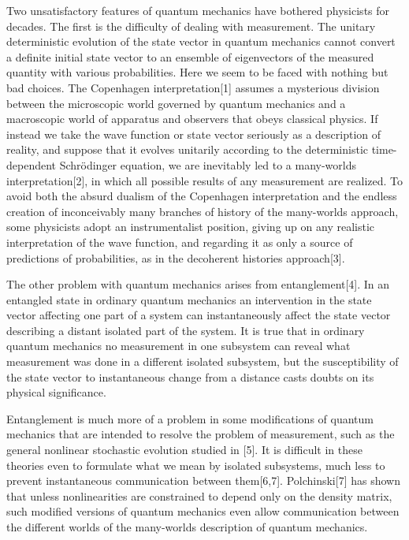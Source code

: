 Two unsatisfactory features of quantum mechanics  have bothered physicists for decades.  The first is the difficulty of dealing with measurement.   The unitary deterministic evolution of the state vector in quantum mechanics cannot convert a definite initial state vector to an ensemble of eigenvectors of the measured quantity with various probabilities.  Here we seem to be faced with nothing but bad choices.  The Copenhagen interpretation[1] assumes  a mysterious division between the microscopic world governed by quantum mechanics and a macroscopic world of apparatus and observers that obeys classical physics.  If instead we take the wave function or state vector seriously as a description of reality, and suppose that it evolves unitarily according to the deterministic time-dependent Schr\"{o}dinger equation, we are inevitably led to a many-worlds interpretation[2], in which all possible results of any measurement are realized.     To avoid both the absurd dualism of the Copenhagen interpretation and   the endless creation of inconceivably many branches of history of the many-worlds approach, some physicists adopt an instrumentalist position, giving  up on any realistic interpretation of the wave function, and regarding it as only a source of predictions of probabilities, as in the decoherent histories approach[3].

The other problem with quantum mechanics arises from entanglement[4].  In an entangled state in ordinary quantum mechanics  an intervention in the state vector affecting one part of a system can instantaneously affect the state vector  describing a distant isolated part of the system.  It is true that in ordinary quantum mechanics no measurement in one subsystem can reveal what measurement was done in a different isolated subsystem, but  the susceptibility of the state vector  to instantaneous change from a distance  casts doubts on its physical significance.  

Entanglement is much more of a problem in some modifications of quantum mechanics that are intended to resolve the problem of measurement, such as  the general nonlinear stochastic evolution studied in [5].  It is difficult in these theories even to formulate what we mean by isolated subsystems, much less to prevent instantaneous communication between them[6,7].  Polchinski[7] has shown that unless nonlinearities are constrained to depend only on the density matrix,   such modified versions of quantum mechanics even allow communication between the different worlds of the many-worlds description of quantum mechanics.

